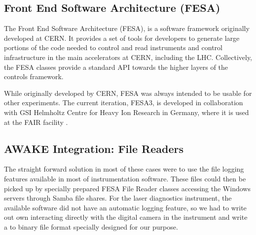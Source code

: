 \subsection{Front End Software Architecture (FESA)}
\label{DAQ:FESA}

The Front End Software Architecture (FESA), is a software framework originally developed at CERN.
It provides a set of tools for developers to generate large portions of the code needed to control and read instruments and control infrastructure in the main accelerators at CERN, including the LHC.
Collectively, the FESA classes provide a standard API towards the higher layers of the controls framework.

While originally developed by CERN, FESA was always intended to be usable for other experiments.
The current iteration, FESA3, is developed in collaboration with GSI Helmholtz Centre for Heavy Ion Research in Germany, where it is used at the FAIR facility \cite{schwinn:2010}.

\subsection{AWAKE Integration: File Readers}
\label{DAQ:Integration}


The straight forward solution in most of these cases were to use the file logging features available in most of instrumentation software.
These files could then be picked up by specially prepared FESA File Reader classes accessing the Windows servers through Samba file shares.
For the laser diagnostics instrument, the available software did not have an automatic logging feature, so we had to write out own interacting directly with the digital camera in the instrument and write a to binary file format specially designed for our purpose.



